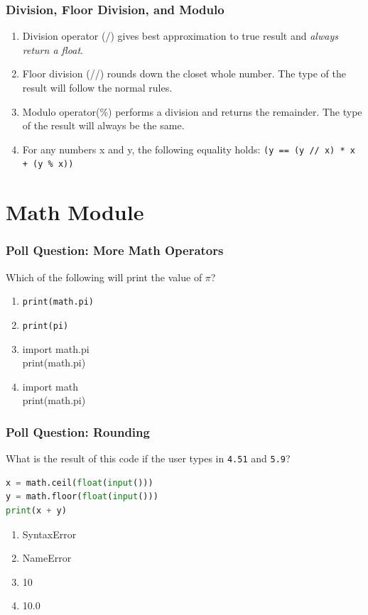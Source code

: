 \documentclass{beamer}
\begin{document}
%
%
%
\begin{frame}[fragile]
  \frametitle{Division, Floor Division, and Modulo}
  \begin{enumerate}
    \item Division operator (/) gives best approximation to true result and \textit{always return a float}.
    \item Floor division (//) rounds down the closet whole number. The type of the result will follow the normal rules.
    \item Modulo operator(\%) performs a division and returns the remainder. The type of the result will always be the same.
    \item For any numbers x and y, the following equality holds: \lstinline|(y == (y // x) * x + (y % x))|
  \end{enumerate}
\end{frame}


\section{Math Module}

%
%
%
\begin{frame}[fragile]
  \frametitle{Poll Question: More Math Operators}
  \vfill
  Which of the following will print the value of $\pi$?
  \begin{enumerate}[A]
    \item \lstinline|print(math.pi)|
    \item \lstinline|print(pi)|
    \item import math.pi\\print(math.pi)
    \item import math\\print(math.pi)
  \end{enumerate}
\end{frame}


%
%
%
\begin{frame}[fragile]
  \frametitle{Poll Question: Rounding}
  What is the result of this code if the user types in \lstinline|4.51| and \lstinline|5.9|?
  \begin{lstlisting}[language=Python, autogobble]
x = math.ceil(float(input()))
y = math.floor(float(input()))
print(x + y)
  \end{lstlisting}
  \vfill
  \begin{enumerate}[A]
    \item SyntaxError
    \item NameError
    \item 10
    \item 10.0
  \end{enumerate}
\end{frame}
\end{document}
